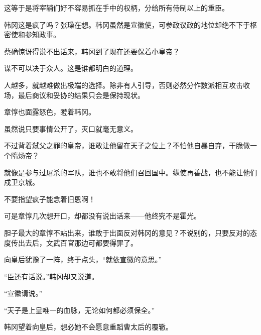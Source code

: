这等于是将宰辅们好不容易抓在手中的权柄，分给所有侍制以上的重臣。

韩冈这是疯了吗？张璪在想。韩冈虽然是宣徽使，可参政议政的地位却绝不下于枢密使和参知政事。

蔡确惊讶得说不出话来，韩冈到了现在还要保着小皇帝？

谋不可以决于众人。这是谁都明白的道理。

人越多，就越难做出极端的选择。除非有人引导，否则必然分作数派相互攻击收场，最后商议和妥协的结果只会是保持现状。

章惇也面露怒色，瞪着韩冈。

虽然说只要事情公开了，灭口就毫无意义。

不过背着弑父之罪的皇帝，谁敢让他留在天子之位上？不怕他自暴自弃，干脆做一个隋炀帝？

就像是参与过屠杀的军队，谁也不敢将他们召回国中。纵使再善战，也不能让他们戍卫京城。

不要指望疯子能念着旧恩啊！

可是章惇几次想开口，却都没有说出话来——他终究不是霍光。

胆子最大的章惇不站出来，谁敢于出面反对韩冈的意见？不说别的，只要反对的态度传出去后，文武百官那边可都要得罪了。

向皇后犹豫了一阵，终于点头，“就依宣徽的意思。”

“臣还有话说。”韩冈却又说道。

“宣徽请说。”

“天子是上皇唯一的血脉，无论如何都必须保全。”

韩冈望着向皇后，想必她不会愿意重蹈曹太后的覆辙。
